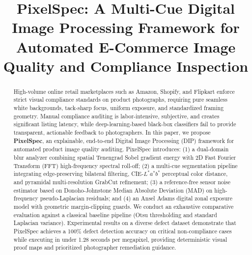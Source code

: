 \documentclass[conference]{IEEEtran}
\begin{document}
\title{PixelSpec: A Multi-Cue Digital Image Processing Framework for Automated E-Commerce Image Quality and Compliance Inspection}

\author{
\and
{}
}

\maketitle

\begin{abstract}
High-volume online retail marketplaces such as Amazon, Shopify, and Flipkart enforce strict visual compliance standards on product photographs, requiring pure seamless white backgrounds, tack-sharp focus, uniform exposure, and standardized framing geometry. Manual compliance auditing is labor-intensive, subjective, and creates significant listing latency, while deep-learning-based black-box classifiers fail to provide transparent, actionable feedback to photographers. In this paper, we propose \textbf{PixelSpec}, an explainable, end-to-end Digital Image Processing (DIP) framework for automated product image quality auditing. PixelSpec introduces: (1) a dual-domain blur analyzer combining spatial Tenengrad Sobel gradient energy with 2D Fast Fourier Transform (FFT) high-frequency spectral roll-off; (2) a multi-cue segmentation pipeline integrating edge-preserving bilateral filtering, CIE-$L^*a^*b^*$ perceptual color distance, and pyramidal multi-resolution GrabCut refinement; (3) a reference-free sensor noise estimator based on Donoho-Johnstone Median Absolute Deviation (MAD) on high-frequency pseudo-Laplacian residuals; and (4) an Ansel Adams digital zonal exposure model with geometric margin-clipping guards. We conduct an exhaustive comparative evaluation against a classical baseline pipeline (Otsu thresholding and standard Laplacian variance). Experimental results on a diverse defect dataset demonstrate that PixelSpec achieves a 100\% defect detection accuracy on critical non-compliance cases while executing in under 1.28 seconds per megapixel, providing deterministic visual proof maps and prioritized photographer remediation guidance.
\end{abstract}
\end{document}
